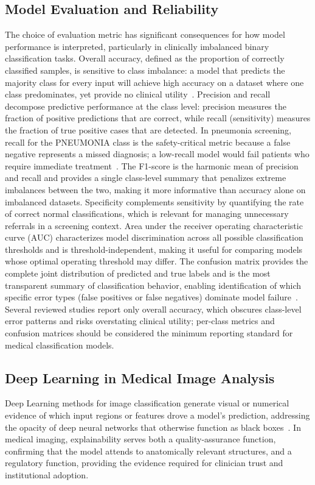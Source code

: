 \documentclass[preprint,12pt]{elsarticle}
\begin{document}
\subsection{Model Evaluation and Reliability}
The choice of evaluation metric has significant consequences for how
model performance is interpreted, particularly in clinically imbalanced
binary classification tasks.
Overall accuracy, defined as the proportion of correctly classified
samples, is sensitive to class imbalance: a model that predicts the
majority class for every input will achieve high accuracy on a dataset
where one class predominates, yet provide no clinical utility~\cite{hashmi2020}.
Precision and recall decompose predictive performance at the class
level: precision measures the fraction of positive predictions that
are correct, while recall (sensitivity) measures the fraction of true
positive cases that are detected.
In pneumonia screening, recall for the PNEUMONIA class is the
safety-critical metric because a false negative represents a missed
diagnosis; a low-recall model would fail patients who require
immediate treatment~\cite{reshan2023}.
The F1-score is the harmonic mean of precision and recall and provides
a single class-level summary that penalizes extreme imbalances between
the two, making it more informative than accuracy alone on imbalanced
datasets.
Specificity complements sensitivity by quantifying the rate of correct
normal classifications, which is relevant for managing unnecessary
referrals in a screening context.
Area under the receiver operating characteristic curve (AUC)
characterizes model discrimination across all possible classification
thresholds and is threshold-independent, making it useful for comparing
models whose optimal operating threshold may differ.
The confusion matrix provides the complete joint distribution of
predicted and true labels and is the most transparent summary of
classification behavior, enabling identification of which specific
error types (false positives or false negatives) dominate model
failure~\cite{hashmi2020}.
Several reviewed studies report only overall accuracy, which obscures
class-level error patterns and risks overstating clinical utility;
per-class metrics and confusion matrices should be considered the
minimum reporting standard for medical classification models.

\subsection{Deep Learning in Medical Image Analysis}
Deep Learning methods for image classification generate visual or
numerical evidence of which input regions or features drove a model's
prediction, addressing the opacity of deep neural networks that
otherwise function as black boxes~\cite{reshan2023}.
In medical imaging, explainability serves both a quality-assurance
function, confirming that the model attends to anatomically relevant
structures, and a regulatory function, providing the evidence required
for clinician trust and institutional adoption.
\end{document}
